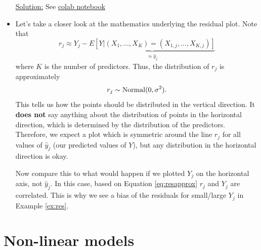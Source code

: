 \begin{itemize}
\begin{example}
\noindent
\underline{Solution:} See \href{https://colab.research.google.com/drive/1q3mfX4od6iLFHy2dYFaKzw6FjaTbAaD3?usp=sharing}{colab notebook}

\end{example}

\item Let's take a closer look at the mathematics underlying the residual plot.
Note that 
\begin{equation}\label{eq:resapprox}
r_j \approx Y_j - \underbrace{E[Y|(X_1,\dots,X_K) = (X_{1,j},\dots,X_{K,j})] }_{\approx \hat{y}_j}
\end{equation}
where $K$ is the number of predictors. 
Thus, the distribution of $r_j$ is approximately 
\begin{equation*}
r_j \sim {\rm Normal}(0,\sigma^2). 
\end{equation*}
This tells us how the points should be distributed in the vertical direction. It {\bf does not} say anything about the distribution of points in the horizontal direction, which is determined by the distribution of the predictors. Therefore, we expect a plot which is symmetric around the line $r_j$ for all values of $\hat{y}_j$ (our predicted values of $Y$), but any distribution in the horizontal direction is okay. 

Now compare this to what would happen if we plotted $Y_j$ on the horizontal axis, not $\hat{y}_j$. In this case, based on Equation \ref{eq:resapprox} $r_j$ and $Y_j$ are correlated. This is why we see a bias of the residuals for small/large $Y_j$ in Example \ref{ex:res}. 

\end{itemize}




\section{Non-linear models}

